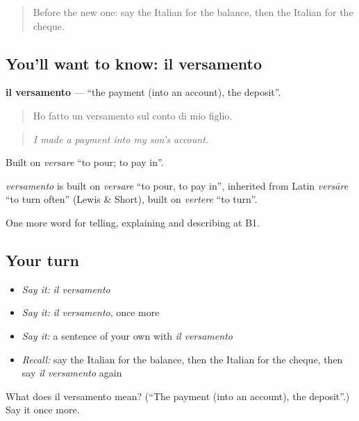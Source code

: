 \begin{quote}
Before the new one: say the Italian for the balance, then the Italian for the cheque.
\end{quote}

\subsection*{You'll want to know: il versamento}
\textbf{il versamento} — \textquotedblleft{}the payment (into an account), the deposit\textquotedblright{}.

\begin{quote}
Ho fatto un versamento sul conto di mio figlio.
\end{quote}

\begin{quote}
\emph{I made a payment into my son's account.}
\end{quote}

Built on \emph{versare} \textquotedblleft{}to pour; to pay in\textquotedblright{}.

\begin{cousinweb}
\emph{versamento} is built on \emph{versare} \textquotedblleft{}to pour, to pay in\textquotedblright{}, inherited from Latin \emph{versāre} \textquotedblleft{}to turn often\textquotedblright{} (Lewis \& Short), built on \emph{vertere} \textquotedblleft{}to turn\textquotedblright{}.
\end{cousinweb}

\begin{grammarlens}[title={What you've built}]
One more word for telling, explaining and describing at B1.
\end{grammarlens}

\subsection*{Your turn}
\begin{itemize}
\raggedright
  \item \emph{Say it:} \emph{il versamento}
  \item \emph{Say it:} \emph{il versamento}, once more
  \item \emph{Say it:} a sentence of your own with \emph{il versamento}
  \item \emph{Recall:} say the Italian for the balance, then the Italian for the cheque, then say \emph{il versamento} again
\end{itemize}

\begin{tcolorbox}[breakable,colback=teal!4,colframe=teal!35!black,title={Before you move on}]
What does il versamento mean? (\textquotedblleft{}The payment (into an account), the deposit\textquotedblright{}.) Say it once more.
\end{tcolorbox}
